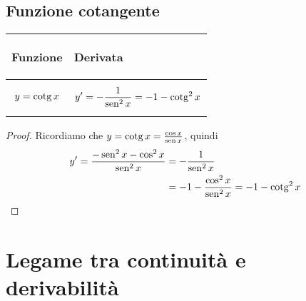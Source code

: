 \documentclass{book}     %
\begin{document}
\subsection{Funzione cotangente}
\begin{center}
    \begin{tabular}{m{}|m{}}
        \begin{center}
            \textbf{Funzione}
        \end{center}
        & 
        \begin{center}
            \textbf{Derivata}
        \end{center}\\
        \hline
            \[y=\operatorname{cotg} x\] &
            \[y'=-\frac{1}{\operatorname{sen}^2x}=-1-\operatorname{cotg}^2x\]
    \end{tabular}
\end{center}
    \begin{proof}
        Ricordiamo che $y=\operatorname{cotg} x =\frac{\cos x}{\operatorname{sen} x}$, quindi 
        \[\begin{aligned}
            y'=\frac{-\operatorname{sen}^2 x-\cos^2 x}{\operatorname{sen}^2 x} &= -\frac{1}{\operatorname{sen}^2 x}\\
                                                  &= -1- \frac{\cos^2x}{\operatorname{sen}^2x }= -1-\operatorname{cotg}^2x 
        \end{aligned}\]
    \end{proof}
\section{Legame tra continuità e derivabilità}
\end{document}
